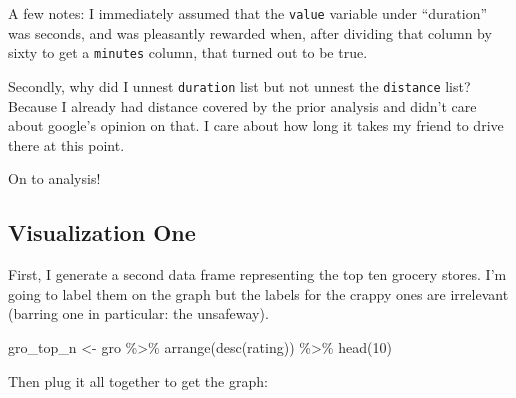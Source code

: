 \documentclass[]{tufte-handout}
\newenvironment{Shaded}{}{}
\newcommand{\DecValTok}[1]{\textcolor[rgb]{0.25,0.63,0.44}{#1}}
\newcommand{\FunctionTok}[1]{\textcolor[rgb]{0.02,0.16,0.49}{#1}}
\newcommand{\NormalTok}[1]{#1}
\newcommand{\OtherTok}[1]{\textcolor[rgb]{0.00,0.44,0.13}{#1}}
\newcommand{\SpecialCharTok}[1]{\textcolor[rgb]{0.25,0.44,0.63}{#1}}
\begin{document}
A few notes: I immediately assumed that the \texttt{value} variable
under ``duration'' was seconds, and was pleasantly rewarded when, after
dividing that column by sixty to get a \texttt{minutes} column, that
turned out to be true.

Secondly, why did I unnest \texttt{duration} list but not unnest the
\texttt{distance} list? Because I already had distance covered by the
prior analysis and didn't care about google's opinion on that. I care
about how long it takes my friend to drive there at this point.

On to analysis!

\hypertarget{visualization-one}{%
\subsection{Visualization One}\label{visualization-one}}

First, I generate a second data frame representing the top ten grocery
stores. I'm going to label them on the graph but the labels for the
crappy ones are irrelevant (barring one in particular: the unsafeway).

\begin{Shaded}
\begin{Highlighting}[]
\NormalTok{gro\_top\_n }\OtherTok{\textless{}{-}}\NormalTok{ gro }\SpecialCharTok{\%\textgreater{}\%} 
  \FunctionTok{arrange}\NormalTok{(}\FunctionTok{desc}\NormalTok{(rating)) }\SpecialCharTok{\%\textgreater{}\%} 
  \FunctionTok{head}\NormalTok{(}\DecValTok{10}\NormalTok{)}
\end{Highlighting}
\end{Shaded}

Then plug it all together to get the graph:
\end{document}
